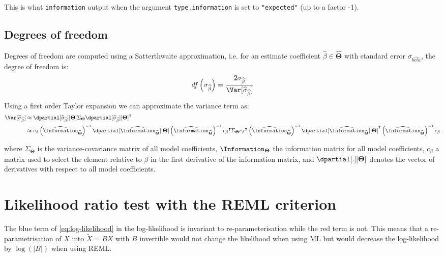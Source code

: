 \documentclass[12pt]{article}
\newcommand\trans[1]{{#1}^\intercal}%
\newcommand{\param}{\Theta}
\newcommand{\Vparam}{\boldsymbol{\param}}
\begin{document}
This is what \texttt{information} output when the argument \texttt{type.information}
is set to \texttt{"expected"} (up to a factor -1).

\clearpage

\subsection{Degrees of freedom}
\label{sec:org1a6bdf7}

Degrees of freedom are computed using a Satterthwaite approximation,
i.e. for an estimate coefficient \(\widehat{\beta}\in\widehat{\Vparam}\) with standard
error \(\sigma_{\widehat{beta}}\), the degree of freedom is:
\begin{align*}
df\left(\sigma_{\widehat{\beta}}\right) = \frac{2 \sigma_{\widehat{\beta}}}{\Var[\widehat{\sigma}_{\widehat{\beta}}]}
\end{align*}
Using a first order Taylor expansion we can approximate the variance term as:
\begin{align*}
\Var[\widehat{\sigma}_{\widehat{\beta}}] & \approx \dpartial[\widehat{\sigma}_{\widehat{\beta}}][\Vparam] \Sigma_{\Vparam}  \trans{\dpartial[\widehat{\sigma}_{\widehat{\beta}}][\Vparam]} \\
& \approx c_{\beta} \left(\widehat{\Information}_{\widehat{\Vparam}}\right)^{-1} \dpartial[\widehat{\Information}_{\widehat{\Vparam}}][\Vparam] \left(\widehat{\Information}_{\widehat{\Vparam}}\right)^{-1} \trans{c_{\beta}} \Sigma_{\Vparam} \trans{c_{\beta}} \left(\widehat{\Information}_{\widehat{\Vparam}}\right)^{-1} \trans{\dpartial[\widehat{\Information}_{\widehat{\Vparam}}][\Vparam]} \left(\widehat{\Information}_{\widehat{\Vparam}}\right)^{-1} c_{\beta}
\end{align*}

where \(\Sigma_{\Vparam}\) is the variance-covariance matrix of all
model coefficients, \(\Information_{\Vparam}\) the information
matrix for all model coefficients, \(c_{\beta}\) a matrix used to
select the element relative to \(\beta\) in the first derivative of
the information matrix, and \(\dpartial[.][\Vparam]\) denotes the
vector of derivatives with respect to all model coefficients.

\clearpage

\section{Likelihood ratio test with the REML criterion}
\label{SM:LRT-REML}
The blue term of \autoref{eq:log-likelihood} in the log-likelihood is
invariant to re-parameterisation while the red term is not. This means
that a re-parametrisation of \(X\) into \(\tilde{X} = B X\) with \(B\)
invertible would not change the likelihood when using ML but would
decrease the log-likelihood by \(\log(|B|)\) when using REML.
\end{document}
